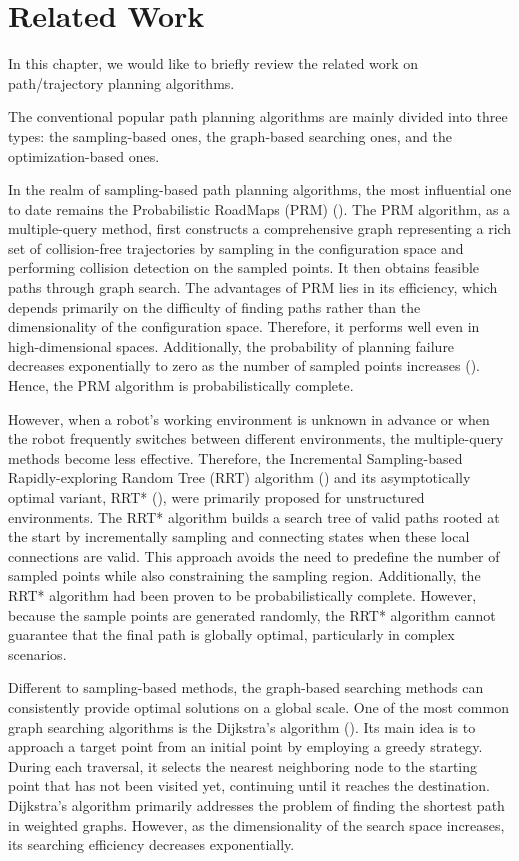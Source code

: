 \section{Related Work}
\label{Section2_RelatedWork}

In this chapter, we would like to briefly review the related work on path/trajectory planning algorithms.

The conventional popular path planning algorithms are mainly divided into three types: the sampling-based ones, the graph-based searching ones, and the optimization-based ones.

In the realm of sampling-based path planning algorithms, the most influential one to date remains the Probabilistic RoadMaps (PRM) (\cite{1996_TRO_PRM}). The PRM algorithm, as a multiple-query method, first constructs a comprehensive graph representing a rich set of collision-free trajectories by sampling in the configuration space and performing collision detection on the sampled points. It then obtains feasible paths through graph search. The advantages of PRM lies in its efficiency, which depends primarily on the difficulty of finding paths rather than the dimensionality of the configuration space. Therefore, it performs well even in high-dimensional spaces. Additionally, the probability of planning failure decreases exponentially to zero as the number of sampled points increases (\cite{1998_TRO_PRM}). Hence, the PRM algorithm is probabilistically complete.

However, when a robot's working environment is unknown in advance or when the robot frequently switches between different environments, the multiple-query methods become less effective. Therefore, the Incremental Sampling-based Rapidly-exploring Random Tree (RRT) algorithm (\cite{2001_IJRR_RRT}) and its asymptotically optimal variant, RRT* (\cite{2011_IJRR_Sampling_based_algorithms}), were primarily proposed for unstructured environments. The RRT* algorithm builds a search tree of valid paths rooted at the start by incrementally sampling and connecting states when these local connections are valid. This approach avoids the need to predefine the number of sampled points while also constraining the sampling region. Additionally, the RRT* algorithm had been proven to be probabilistically complete. However, because the sample points are generated randomly, the RRT* algorithm cannot guarantee that the final path is globally optimal, particularly in complex scenarios.

Different to sampling-based methods, the graph-based searching methods can consistently provide optimal solutions on a global scale. One of the most common graph searching algorithms is the Dijkstra's algorithm (\cite{1959_NM_Dijkstra}). Its main idea is to approach a target point from an initial point by employing a greedy strategy. During each traversal, it selects the nearest neighboring node to the starting point that has not been visited yet, continuing until it reaches the destination. Dijkstra's algorithm primarily addresses the problem of finding the shortest path in weighted graphs. However, as the dimensionality of the search space increases, its searching efficiency decreases exponentially.


